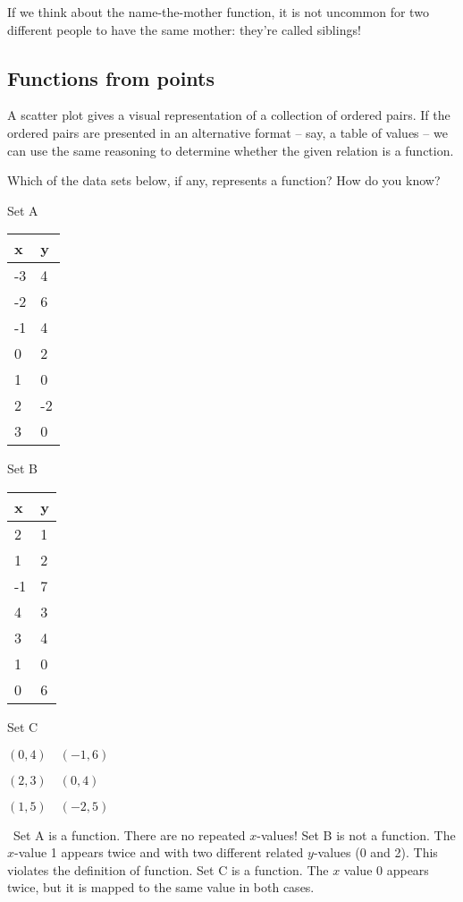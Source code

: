 If we think about the name-the-mother function, it is not uncommon for two different people to have the same mother: they're called siblings!

\subsection{Functions from points}

A scatter plot gives a visual representation of a collection of ordered pairs. If the ordered pairs are presented in an alternative format -- say, a table of values -- we can use the same reasoning to determine whether the given relation is a function.

\begin{boxedex}
Which of the data sets below, if any, represents a function? How do you know?

\begin{minipage}[t]{0.33\textwidth}
\centering
Set A
\par\begin{tabular}{|C{1.5cm}|C{1.5cm}|}
\hline
x & y \\ & 4\\
-2 & 6\\
-1 & 4\\
0 & 2\\
1 & 0\\
2 & -2\\
3 & 0\\\hline
\end{tabular}
\end{minipage}
\begin{minipage}[t]{0.33\textwidth}
\centering
Set B
\par\begin{tabular}{|C{1.5cm}|C{1.5cm}|}
\hline
x & y \\ & 1\\
1 & 2\\
-1 & 7\\
4 & 3\\
3 & 4\\
1 & 0\\
0 & 6\\\hline
\end{tabular}
\end{minipage}
\begin{minipage}[t]{0.33\textwidth}
\centering
Set C
\par$(0,4) \quad (-1,6)$
\par$(2,3) \quad (0,4)$
\par$(1,5) \quad (-2,5)$
\end{minipage}

\exsoln\ Set A is a function. There are no repeated $x$-values! Set B is not a function. The $x$-value 1 appears twice and with two different related $y$-values (0 and 2). This violates the definition of function. Set C is a function. The $x$ value 0 appears twice, but it is mapped to the same value in both cases.
\end{boxedex}

